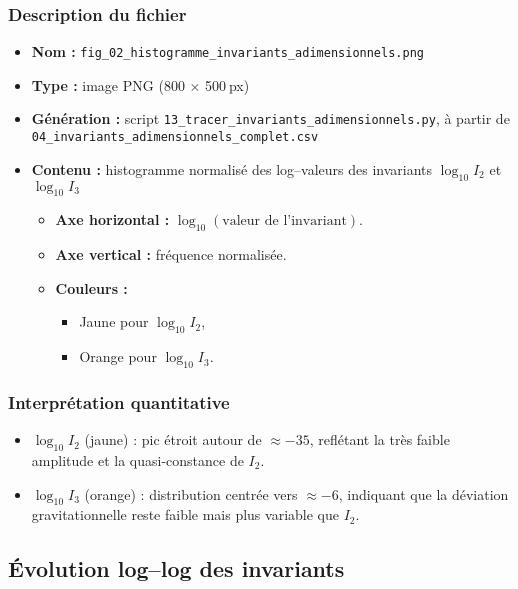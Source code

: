 \subsubsection*{Description du fichier}
\begin{itemize}
  \item \textbf{Nom :} \texttt{fig\_02\_histogramme\_invariants\_adimensionnels.png}
  \item \textbf{Type :} image PNG (800 × 500 px)
  \item \textbf{Génération :} script \texttt{13\_tracer\_invariants\_adimensionnels.py}, à partir de \texttt{04\_invariants\_adimensionnels\_complet.csv}
  \item \textbf{Contenu :} histogramme normalisé des log–valeurs des invariants
    \(
      \log_{10}I_{2}
    \)
    et
    \(
      \log_{10}I_{3}
    \)
    \begin{itemize}
      \item \textbf{Axe horizontal :} \(\log_{10}(\text{valeur de l’invariant})\).
      \item \textbf{Axe vertical :} fréquence normalisée.
      \item \textbf{Couleurs :}
        \begin{itemize}
          \item Jaune pour \(\log_{10}I_{2}\),
          \item Orange pour \(\log_{10}I_{3}\).
        \end{itemize}
    \end{itemize}
\end{itemize}

\subsubsection*{Interprétation quantitative}
\begin{itemize}
  \item \(\log_{10}I_{2}\) (jaune) : pic étroit autour de \(\approx -35\), reflétant la très faible amplitude et la quasi-constance de \(I_{2}\).
  \item \(\log_{10}I_{3}\) (orange) : distribution centrée vers \(\approx -6\), indiquant que la déviation gravitationnelle reste faible mais plus variable que \(I_{2}\).
\end{itemize}

\bigskip
\subsection{Évolution log–log des invariants}

